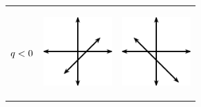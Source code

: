 \begin{center}
\begin{xtabular*}{\mytablewidth}[t]{|p{10\mystarwidth}|p{10\mystarwidth}|p{10\mystarwidth}|}
    
        
                  \begin{math}q<{}0\end{math}
                 &
    
    
        
                  
    \setcounter{subfigure}{0}

\label{m39338*id238353}
    \begin{center}
    \label{m39338*id238353!!!underscore!!!media}\label{m39338*id238353!!!underscore!!!printimage}\includegraphics[width=100px]{col11306.imgs/m39338_MG10C11_008.png} %
        
      \vspace{2pt}
    \vspace{.1in}
    
    \end{center}



    \addtocounter{footnote}{-0}
    
                 &
    
    
        
                  
    \setcounter{subfigure}{0}

\label{m39338*id238365}
    \begin{center}
    \label{m39338*id238365!!!underscore!!!media}\label{m39338*id238365!!!underscore!!!printimage}\includegraphics[width=100px]{col11306.imgs/m39338_MG10C11_009.png} %
        

\end{center}
\end{xtabular*}
\end{center}

